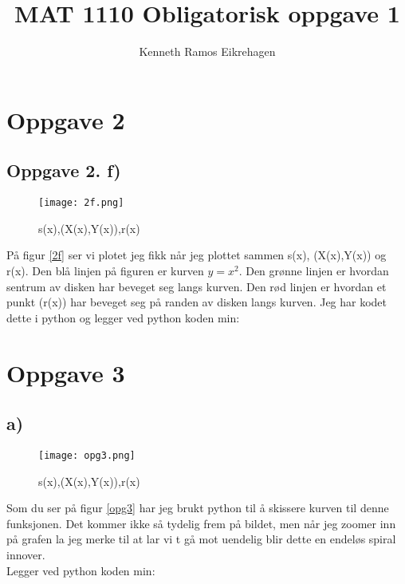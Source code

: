 \documentclass[a4paper,12pt,norsk]{article}
\title{MAT 1110 Obligatorisk oppgave 1}
\author{Kenneth Ramos Eikrehagen}
\begin{document}
\maketitle
\section{Oppgave 2}
\subsection{Oppgave 2. f)}
\begin{figure}[h!]
\texttt{[image: 2f.png]} 
\caption{s(x),(X(x),Y(x)),r(x)}
\label{2f}
\end{figure}
På figur \vref{2f} ser vi plotet jeg fikk når jeg plottet sammen s(x), (X(x),Y(x)) og r(x). Den blå linjen på figuren er kurven $y = x^2$. Den grønne linjen er hvordan sentrum av disken har beveget seg langs kurven. Den rød linjen er hvordan et punkt (r(x)) har beveget seg på randen av disken langs kurven.
Jeg har kodet dette i python og legger ved python koden min:


\section{Oppgave 3}
\subsection{a)}
\begin{figure}[h!]
\texttt{[image: opg3.png]} 
\caption{s(x),(X(x),Y(x)),r(x)}
\label{opg3}
\end{figure}
Som du ser på figur \vref{opg3} har jeg brukt python til å skissere kurven til denne funksjonen. Det kommer ikke så tydelig frem på bildet, men når jeg zoomer inn på grafen la jeg merke til at lar vi t gå mot uendelig blir dette en endeløs spiral innover. \\
Legger ved python koden min:

\end{document}
